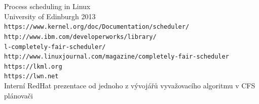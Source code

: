 \documentclass[
  master=true,
  font=sans,
  printversion=false,
  joinlists=true,
  figures=true,
  tables=true,
  sourcecodes=false,
  theorems=false,
  bibencoding=utf8,
  language=czech,
  encoding=utf8,
  field=ainfk,
  biblatex,
  glossaries,
  index
]{kidiplom}
\begin{document}
\nocite{*}



\printindex


\begin{thebibliography}{9}
               {Process scheduling in Linux} \\ 
               University of Edinburgh 2013
  \\
               \texttt{https://www.kernel.org/doc/Documentation/scheduler/}
   \\
		\texttt{http://www.ibm.com/developerworks/library/} \\
		\texttt{l-completely-fair-scheduler/}
   \\
		\texttt{http://www.linuxjournal.com/magazine/completely-fair-scheduler}
   \\ 
		\texttt{https://lkml.org} \\
		\texttt{https://lwn.net}
   \\
		Interní RedHat prezentace od jednoho z vývojářů vyvažovacího algoritmu v CFS plánovači

\end{thebibliography}
\end{document}
